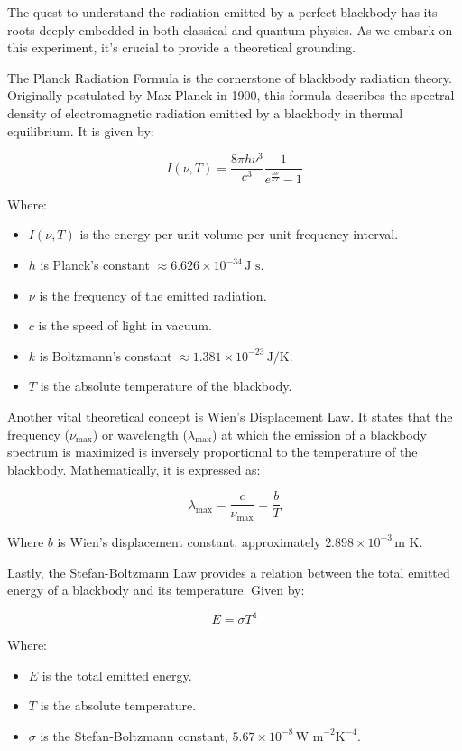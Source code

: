 \documentclass[10pt,letterpaper,onecolumn]{article}
\begin{document}
The quest to understand the radiation emitted by a perfect blackbody has its roots deeply embedded in both 
classical and quantum physics. As we embark on this experiment, it's crucial to provide a theoretical grounding.

The Planck Radiation Formula is the cornerstone of blackbody radiation theory. 
Originally postulated by Max Planck in 1900, this formula describes the spectral density of electromagnetic 
radiation emitted by a blackbody in thermal equilibrium. It is given by:

\[ I(\nu, T) = \frac{8\pi h\nu^3}{c^3} \frac{1}{e^{\frac{h\nu}{kT}} - 1} \]

Where:
\begin{itemize}
  \item \(I(\nu, T)\) is the energy per unit volume per unit frequency interval.
  \item \(h\) is Planck's constant \(\approx 6.626 \times 10^{-34} \, \text{J s}\).
  \item \(\nu\) is the frequency of the emitted radiation.
  \item \(c\) is the speed of light in vacuum.
  \item \(k\) is Boltzmann's constant \(\approx 1.381 \times 10^{-23} \, \text{J/K}\).
  \item \(T\) is the absolute temperature of the blackbody\cite{planck_1900}.
\end{itemize}

Another vital theoretical concept is Wien's Displacement Law. 
It states that the frequency (\(\nu_{\text{max}}\)) or wavelength (\(\lambda_{\text{max}}\)) at 
which the emission of a blackbody spectrum is maximized is inversely proportional to the temperature of 
the blackbody. Mathematically, it is expressed as:

\[ \lambda_{\text{max}} = \frac{c}{\nu_{\text{max}}} = \frac{b}{T} \]

Where \(b\) is Wien's displacement constant, approximately \(2.898 \times 10^{-3} \, \text{m K}\)\cite{wien_law}.

Lastly, the Stefan-Boltzmann Law provides a relation between the total 
emitted energy of a blackbody and its temperature. Given by:

\[ E = \sigma T^4 \]

Where:
\begin{itemize}
  \item \(E\) is the total emitted energy.
  \item \(T\) is the absolute temperature.
  \item \(\sigma\) is the Stefan-Boltzmann constant, \(5.67 \times 10^{-8} \, \text{W m}^{-2} \text{K}^{-4}\)\cite{stefan_boltzmann}.
\end{itemize}
\end{document}
